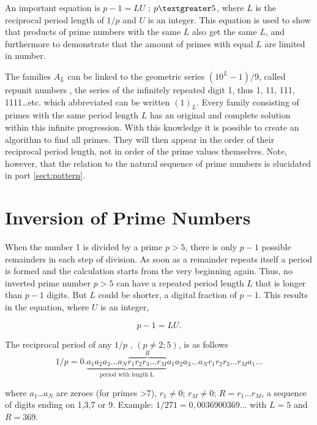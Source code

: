 \documentclass[10pt,twoside,a4paper]{amsart}
\begin{document}
An important equation is $p-1 = LU$ ; $p{\textgreater}5$, where $L$ is the reciprocal period length of $1/p$ and $U$ is an integer. This equation is used to show that products of prime numbers with the same $L$ also get the same $L$, and furthermore to demonstrate that the amount of primes with equal $L$ are limited in number. 

The families $A_{L}$ can be linked to the geometric series $(10^{L} - 1)/9$, called repunit numbers \cite{Beiler}, the series of the infinitely repeated digit 1, thus 1, 11, 111, 1111\ldots etc. which abbreviated can be written $(1)_{L}$. Every family consisting of primes with the same period length $L$ has an original and complete solution within this infinite progression. With this knowledge it is possible to create an algorithm to find all primes. They will then appear in the order of their reciprocal period length, not in order of the prime values themselves. Note, however, that the relation to the natural sequence of prime numbers is elucidated in part \ref{sect:pattern}.

\section{Inversion of Prime Numbers}

When the number 1 is divided by a prime $p>5$, there is only $p-1$ possible remainders in each step of division. As soon as a remainder repeats itself a period is formed and the calculation starts from the very beginning again. Thus, no inverted prime number $p > 5$ can have a repeated period length $L$ that is longer than $p-1$ digits. But $L$ could be shorter, a digital fraction of $p-1$. This results in the equation, where $U$ is an integer,

\begin{equation}
\label{eq:plu}
p-1 = LU.
\end{equation}

The reciprocal period of any $1/p$ , $(p \neq  2;5)$, is as follows
\begin{equation}
\label{eq:b}
1/p=0.\underbrace{a_{1}a_{2}a_{3}...a_{N}\overbrace{r_{1}r_{2}r_{3}...r_{M}}^{R}}_{\text{period with length L}}a_{1}a_{2}a_{3}...a_{N}r_{1}r_{2}r_{3}...r_{M}a_{1}...
\end{equation}

where $a_{1}$\ldots $a_{N}$ are zeroes (for primes {\textgreater}7), $r_{1}\neq 0$; $r_{M} \neq 0$; $R = r_{1}...r_{M}$, a sequence of digits ending on 1,3,7 or 9. Example: $1/271 = 0,0036900369\ldots$ with $L = 5$ and $R = 369$.
\end{document}
